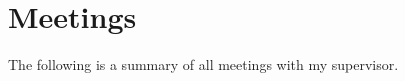 \documentclass[report.tex]{subfiles}
\begin{document}
\section{Meetings} %
\label{sec:meetings}
The following is a summary of all meetings with my supervisor.
\end{document}
